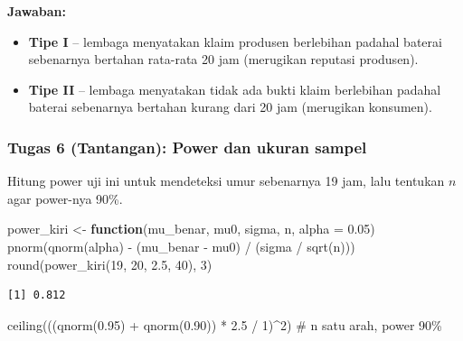 \documentclass[
  indonesian,
  letterpaper,
]{book}
\newenvironment{Shaded}{\begin{snugshade}}{\end{snugshade}}
\newcommand{\AttributeTok}[1]{\textcolor[rgb]{0.40,0.45,0.13}{#1}}
\newcommand{\CommentTok}[1]{\textcolor[rgb]{0.37,0.37,0.37}{#1}}
\newcommand{\ControlFlowTok}[1]{\textcolor[rgb]{0.00,0.23,0.31}{\textbf{#1}}}
\newcommand{\DecValTok}[1]{\textcolor[rgb]{0.68,0.00,0.00}{#1}}
\newcommand{\FloatTok}[1]{\textcolor[rgb]{0.68,0.00,0.00}{#1}}
\newcommand{\FunctionTok}[1]{\textcolor[rgb]{0.28,0.35,0.67}{#1}}
\newcommand{\NormalTok}[1]{\textcolor[rgb]{0.00,0.23,0.31}{#1}}
\newcommand{\OtherTok}[1]{\textcolor[rgb]{0.00,0.23,0.31}{#1}}
\newcommand{\SpecialCharTok}[1]{\textcolor[rgb]{0.37,0.37,0.37}{#1}}
\providecommand{\tightlist}{%
  \setlength{\itemsep}{0pt}\setlength{\parskip}{0pt}}
\begin{document}
\textbf{Jawaban:}

\begin{itemize}
\tightlist
\item
  \textbf{Tipe I} -- lembaga menyatakan klaim produsen berlebihan
  padahal baterai sebenarnya bertahan rata-rata 20 jam (merugikan
  reputasi produsen).
\item
  \textbf{Tipe II} -- lembaga menyatakan tidak ada bukti klaim
  berlebihan padahal baterai sebenarnya bertahan kurang dari 20 jam
  (merugikan konsumen).
\end{itemize}

\subsubsection{Tugas 6 (Tantangan): Power dan ukuran
sampel}\label{tugas-6-tantangan-power-dan-ukuran-sampel}

Hitung power uji ini untuk mendeteksi umur sebenarnya 19 jam, lalu
tentukan \(n\) agar power-nya 90\%.

\begin{Shaded}
\begin{Highlighting}[]
\NormalTok{power\_kiri }\OtherTok{\textless{}{-}} \ControlFlowTok{function}\NormalTok{(mu\_benar, mu0, sigma, n, }\AttributeTok{alpha =} \FloatTok{0.05}\NormalTok{)}
  \FunctionTok{pnorm}\NormalTok{(}\FunctionTok{qnorm}\NormalTok{(alpha) }\SpecialCharTok{{-}}\NormalTok{ (mu\_benar }\SpecialCharTok{{-}}\NormalTok{ mu0) }\SpecialCharTok{/}\NormalTok{ (sigma }\SpecialCharTok{/} \FunctionTok{sqrt}\NormalTok{(n)))}
\FunctionTok{round}\NormalTok{(}\FunctionTok{power\_kiri}\NormalTok{(}\DecValTok{19}\NormalTok{, }\DecValTok{20}\NormalTok{, }\FloatTok{2.5}\NormalTok{, }\DecValTok{40}\NormalTok{), }\DecValTok{3}\NormalTok{)}
\end{Highlighting}
\end{Shaded}

\begin{verbatim}
[1] 0.812
\end{verbatim}

\begin{Shaded}
\begin{Highlighting}[]
\FunctionTok{ceiling}\NormalTok{(((}\FunctionTok{qnorm}\NormalTok{(}\FloatTok{0.95}\NormalTok{) }\SpecialCharTok{+} \FunctionTok{qnorm}\NormalTok{(}\FloatTok{0.90}\NormalTok{)) }\SpecialCharTok{*} \FloatTok{2.5} \SpecialCharTok{/} \DecValTok{1}\NormalTok{)}\SpecialCharTok{\^{}}\DecValTok{2}\NormalTok{)   }\CommentTok{\# n satu arah, power 90\%}
\end{Highlighting}
\end{Shaded}
\end{document}
